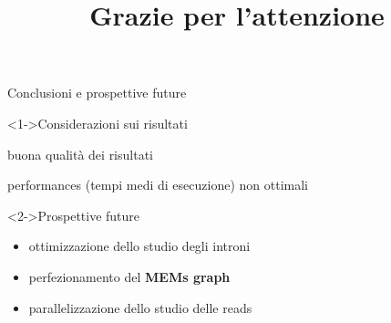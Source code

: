 \documentclass{beamer}
\begin{document}
\begin{tframe}{Conclusioni e prospettive future}
  \begin{block}<1->{Considerazioni sui risultati}
    \begin{adv}
      \item buona qualità dei risultati
    \end{adv}
    \begin{disadv}
      \item performances (tempi medi di esecuzione) non ottimali
    \end{disadv}
  \end{block}
  \vspace{5mm}
  
   \begin{block}<2->{Prospettive future}
     \begin{itemize}
       \item ottimizzazione dello studio degli introni
       \item perfezionamento del \textbf{MEMs graph}
       \item parallelizzazione dello studio delle reads
     \end{itemize}
  \end{block}
\end{tframe}
\title{Grazie per l'attenzione}
\titlepageframe
\end{document}

